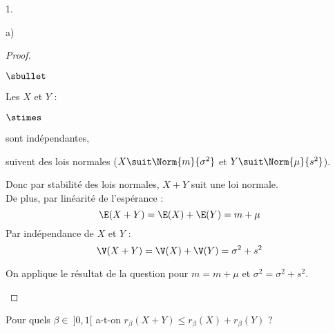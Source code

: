 \begin{noliste}{1.}
\begin{noliste}{a)}
    \begin{proof}~
      \begin{noliste}{$\sbullet$}
	\item Les \var $X$ et $Y$ :
	\begin{noliste}{$\stimes$}
	  \item sont indépendantes,
	  \item suivent des lois normales ($X \suit \Norm{m}{
	  \sigma^2}$ et $Y \suit \Norm{\mu}{s^2}$).
	\end{noliste}
	Donc par stabilité des lois normales, $X+Y$ suit une loi 
	normale.\\
	De plus, par linéarité de l'espérance :
	\[
	  \E(X+Y) = \E(X) + \E(Y) = m+\mu
	\]
	Par indépendance de $X$ et $Y$ :
	\[
	  \V(X+Y) = \V(X)+\V(Y) = \sigma^2+s^2
	\]
	
	\item On applique le résultat de la question 
	pour $m=m+\mu$ et $\sigma^2=\sigma^2+s^2$.
	~\\[-1.4cm]
      \end{noliste}
    \end{proof}

    
    \item Pour quels $\beta \in \ ]0,1[$ a-t-on $r_{\beta}(X+Y) \leq
    r_\beta(X)+r_\beta(Y)$ ?
    

\end{noliste}
\end{noliste}
